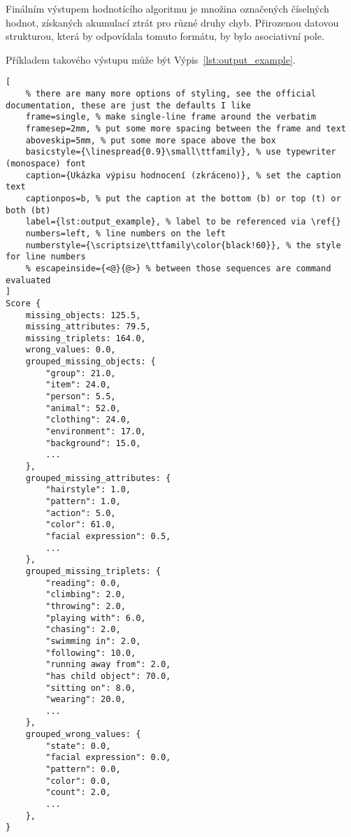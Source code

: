Finálním výstupem hodnotícího algoritmu je množina označených číselných hodnot, získaných akumulací ztrát pro různé druhy chyb.
Přirozenou datovou strukturou, která by odpovídala tomuto formátu, by bylo asociativní pole.

Příkladem takového výstupu může být Výpis~\ref{lst:output_example}.

\newpage
\begin{lstlisting}[
	% there are many more options of styling, see the official documentation, these are just the defaults I like
	frame=single, % make single-line frame around the verbatim
	framesep=2mm, % put some more spacing between the frame and text
	aboveskip=5mm, % put some more space above the box
	basicstyle={\linespread{0.9}\small\ttfamily}, % use typewriter (monospace) font
	caption={Ukázka výpisu hodnocení (zkráceno)}, % set the caption text
	captionpos=b, % put the caption at the bottom (b) or top (t) or both (bt)
	label={lst:output_example}, % label to be referenced via \ref{}
	numbers=left, % line numbers on the left
	numberstyle={\scriptsize\ttfamily\color{black!60}}, % the style for line numbers
	% escapeinside={<@}{@>} % between those sequences are command evaluated
]
Score {
    missing_objects: 125.5,
    missing_attributes: 79.5,
    missing_triplets: 164.0,
    wrong_values: 0.0,
    grouped_missing_objects: {
        "group": 21.0,
        "item": 24.0,
        "person": 5.5,
        "animal": 52.0,
        "clothing": 24.0,
        "environment": 17.0,
        "background": 15.0,
        ...
    },
    grouped_missing_attributes: {
        "hairstyle": 1.0,
        "pattern": 1.0,
        "action": 5.0,
        "color": 61.0,
        "facial expression": 0.5,
        ...
    },
    grouped_missing_triplets: {
        "reading": 0.0,
        "climbing": 2.0,
        "throwing": 2.0,
        "playing with": 6.0,
        "chasing": 2.0,
        "swimming in": 2.0,
        "following": 10.0,
        "running away from": 2.0,
        "has child object": 70.0,
        "sitting on": 8.0,
        "wearing": 20.0,
        ...
    },
    grouped_wrong_values: {
        "state": 0.0,
        "facial expression": 0.0,
        "pattern": 0.0,
        "color": 0.0,
        "count": 2.0,
        ...
    },
}
\end{lstlisting}
